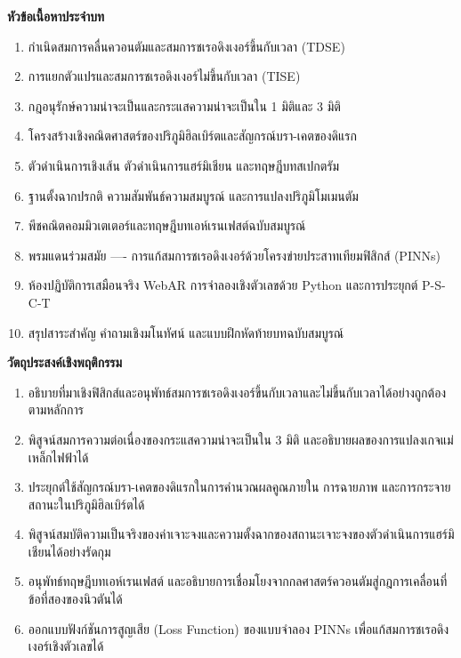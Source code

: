 \begin{lessonplanbox}
\noindent\textbf{หัวข้อเนื้อหาประจำบท}
\begin{enumerate}
    \item กำเนิดสมการคลื่นควอนตัมและสมการชเรอดิงเงอร์ขึ้นกับเวลา (TDSE)
    \item การแยกตัวแปรและสมการชเรอดิงเงอร์ไม่ขึ้นกับเวลา (TISE)
    \item กฎอนุรักษ์ความน่าจะเป็นและกระแสความน่าจะเป็นใน 1 มิติและ 3 มิติ
    \item โครงสร้างเชิงคณิตศาสตร์ของปริภูมิฮิลเบิร์ตและสัญกรณ์บรา-เคตของดิแรก
    \item ตัวดำเนินการเชิงเส้น ตัวดำเนินการแฮร์มิเชียน และทฤษฎีบทสเปกตรัม
    \item ฐานตั้งฉากปรกติ ความสัมพันธ์ความสมบูรณ์ และการแปลงปริภูมิโมเมนตัม
    \item พีชคณิตคอมมิวเตเตอร์และทฤษฎีบทเอห์เรนเฟสต์ฉบับสมบูรณ์
    \item พรมแดนร่วมสมัย ---- การแก้สมการชเรอดิงเงอร์ด้วยโครงข่ายประสาทเทียมฟิสิกส์ (PINNs)
    \item ห้องปฏิบัติการเสมือนจริง WebAR การจำลองเชิงตัวเลขด้วย Python และการประยุกต์ P-S-C-T
    \item สรุปสาระสำคัญ คำถามเชิงมโนทัศน์ และแบบฝึกหัดท้ายบทฉบับสมบูรณ์
\end{enumerate}

\noindent\textbf{วัตถุประสงค์เชิงพฤติกรรม}
\begin{enumerate}
    \item อธิบายที่มาเชิงฟิสิกส์และอนุพัทธ์สมการชเรอดิงเงอร์ขึ้นกับเวลาและไม่ขึ้นกับเวลาได้อย่างถูกต้องตามหลักการ
    \item พิสูจน์สมการความต่อเนื่องของกระแสความน่าจะเป็นใน 3 มิติ และอธิบายผลของการแปลงเกจแม่เหล็กไฟฟ้าได้
    \item ประยุกต์ใช้สัญกรณ์บรา-เคตของดิแรกในการคำนวณผลคูณภายใน การฉายภาพ และการกระจายสถานะในปริภูมิฮิลเบิร์ตได้
    \item พิสูจน์สมบัติความเป็นจริงของค่าเจาะจงและความตั้งฉากของสถานะเจาะจงของตัวดำเนินการแฮร์มิเชียนได้อย่างรัดกุม
    \item อนุพัทธ์ทฤษฎีบทเอห์เรนเฟสต์ และอธิบายการเชื่อมโยงจากกลศาสตร์ควอนตัมสู่กฎการเคลื่อนที่ข้อที่สองของนิวตันได้
    \item ออกแบบฟังก์ชันการสูญเสีย (Loss Function) ของแบบจำลอง PINNs เพื่อแก้สมการชเรอดิงเงอร์เชิงตัวเลขได้
\end{enumerate}
\end{lessonplanbox}

\newpage
